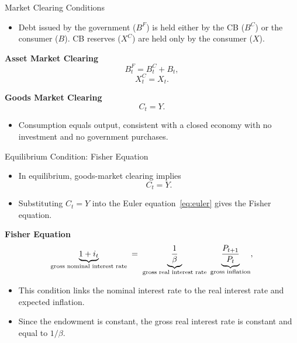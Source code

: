 \documentclass[11pt,aspectratio=169]{beamer}
\begin{document}
\begin{frame}[label=market]{Market Clearing Conditions}

\begin{itemize}
    \item Debt issued by the government ($B^F$) is held either by the CB ($B^C$) or the consumer ($B$). CB reserves ($X^C$) are held only by the consumer ($X$).
\end{itemize}

\vspace{0.25cm}
\noindent\textbf{Asset Market Clearing}
\begin{equation}
B_t^{F} = B_t^{C}+B_t,
\label{eq: Bonds}
\end{equation}
\begin{equation}
X_t^{C} = X_t.
\label{eq: reserves}
\end{equation}

\vspace{0.25cm}
\noindent\textbf{Goods Market Clearing}
\[
C_t=Y.
\]

\begin{itemize}
    \item Consumption equals output, consistent with a closed economy with no investment and no government purchases.
\end{itemize}

\vspace{0.3cm}
\begin{center}
\hyperlink{gdp_proof}{}
\end{center}

\end{frame}


\begin{frame}{Equilibrium Condition: Fisher Equation}
\small

\begin{itemize}
  \item In equilibrium, goods-market clearing implies
  \[
  C_t = Y.
  \]
  \item Substituting $C_t=Y$ into the Euler equation~\eqref{eq:euler} gives the Fisher equation.
\end{itemize}

\vspace{0.2cm}
\noindent\textbf{Fisher Equation}
\begin{equation}
\underbrace{1+i_t}_{\text{\scriptsize gross nominal interest rate}}
\;=\;
\underbrace{\frac{1}{\beta}}_{\text{\scriptsize gross real interest rate}}
\;\underbrace{\frac{P_{t+1}}{P_t}}_{\text{\scriptsize gross inflation}},
\label{eq: Fisher}
\end{equation}

\begin{itemize}
  \item This condition links the nominal interest rate to the real interest rate and expected inflation.
  \item Since the endowment is constant, the gross real interest rate is constant and equal to $1/\beta$.
\end{itemize}

\end{frame}
\end{document}
